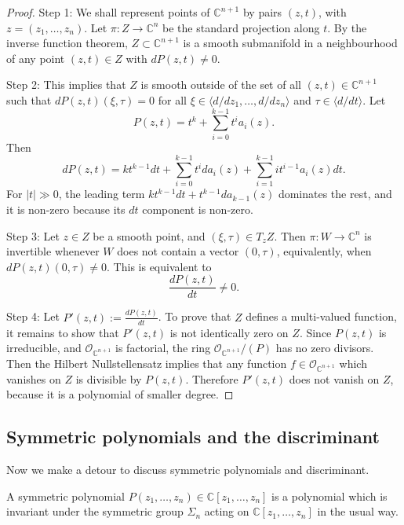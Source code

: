 \begin{proof}
Step 1: We shall represent points of
$\mathbb{C}^{n+1}$ by pairs $(z,t)$, with
$z=(z_1,\dots,z_n)$. Let $\pi:Z\to \mathbb{C}^n$
be the standard projection along $t$. By
the inverse function theorem, $Z \subset
\mathbb{C}^{n+1}$ is a smooth submanifold in
a neighbourhood of any point $(z,t)\in Z$
with $dP(z,t)\neq 0$.

Step 2: This implies that $Z$ is smooth
outside of the set of all $(z,t)\in
\mathbb{C}^{n+1}$ such that
$dP(z,t)(\xi,\tau)=0$ for all
$\xi \in \langle d/dz_1,\dots,d/dz_n\rangle$
and $\tau \in \langle d/dt\rangle$.
Let
$$
P(z,t)=t^k+\sum_{i=0}^{k-1} t^i a_i(z).
$$
Then
$$
dP(z,t)=kt^{k-1}dt
+ \sum_{i=0}^{k-1} t^i da_i(z)
+ \sum_{i=1}^{k-1} i t^{i-1} a_i(z) dt.
$$
For $|t|\gg 0$, the leading term
$kt^{k-1}dt+t^{k-1}da_{k-1}(z)$ dominates
the rest, and it is non-zero because its
$dt$ component is non-zero.

Step 3: Let $z \in Z$ be a smooth point,
and $(\xi,\tau)\in T_zZ$. Then
$\pi:W \to \mathbb{C}^n$ is invertible
whenever $W$ does not contain a vector
$(0,\tau)$, equivalently, when
$dP(z,t)(0,\tau)\neq 0$. This is equivalent
to
$$
\frac{dP(z,t)}{dt}\neq 0.
$$

Step 4: Let
$P'(z,t):=\frac{dP(z,t)}{dt}$.
To prove that $Z$ defines a multi-valued
function, it remains to show that
$P'(z,t)$ is not identically zero on $Z$.
Since $P(z,t)$ is irreducible, and
$\mathcal{O}_{\mathbb{C}^{n+1}}$ is
factorial, the ring
$\mathcal{O}_{\mathbb{C}^{n+1}}/(P)$ has no
zero divisors. Then the Hilbert
Nullstellensatz implies that any function
$f \in \mathcal{O}_{\mathbb{C}^{n+1}}$
which vanishes on $Z$ is divisible by
$P(z,t)$. Therefore $P'(z,t)$ does not
vanish on $Z$, because it is a polynomial
of smaller degree.
\end{proof}

\subsection{Symmetric polynomials and the
discriminant}
\label{subsection-symmetric-polynomials-discriminant}

\medskip\noindent
Now we make a detour
to discuss
symmetric polynomials and discriminant.

\begin{definition}
\label{definition-symmetric-polynomial}
A symmetric polynomial
$P(z_1,\dots,z_n)\in \mathbb{C}[z_1,\dots,z_n]$
is a polynomial which is invariant under the
symmetric group $\Sigma_n$ acting on
$\mathbb{C}[z_1,\dots,z_n]$ in the usual
way.
\end{definition}

